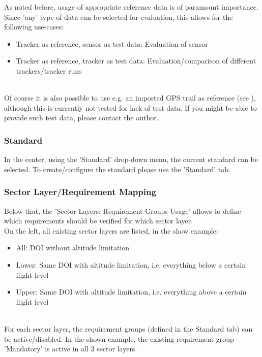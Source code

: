 As noted before, usage of appropriate reference data is of paramount importance. \\

Since 'any' type of data can be selected for evaluation, this allows for the following use-cases:
\begin{itemize}  
\item Tracker as reference, sensor as test data: Evaluation of sensor
\item Tracker as reference, tracker as test data: Evaluation/comparison of different trackers/tracker runs
\end{itemize}
\ \\

Of course it is also possible to use e.g. an imported GPS trail as reference (see ), although this is currently not tested for lack of test data. If you might be able to provide such test data, please contact the author. \\

\subsubsection{Standard}
In the center, using the 'Standard' drop-down menu, the current standard can be selected. To create/configure the standard please use the 'Standard' tab.

\subsubsection{Sector Layer/Requirement Mapping}

Below that, the 'Sector Layers: Requirement Groups Usage' allows to define which requirements should be verified for which sector layer. \\

On the left, all existing sector layers are listed, in the show example:
\begin{itemize}  
\item All: DOI without altitude limitation
\item Lower: Same DOI with altitude limitation, i.e. everything below a certain flight level
\item Upper: Same DOI with altitude limitation, i.e. everything above a certain flight level
\end{itemize}
\ \\

For each sector layer, the requirement groups (defined in the Standard tab) can be active/disabled. In the shown example, the existing requirement group 'Mandatory' is active in all 3 sector layers.

